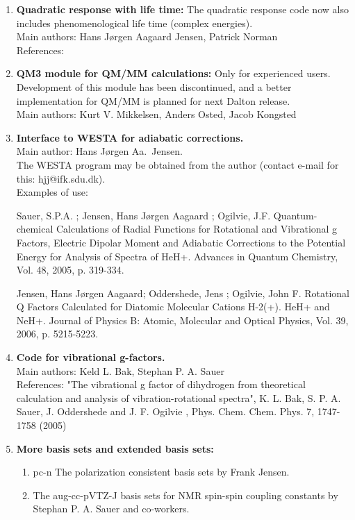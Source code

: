 \begin{enumerate}
\item{\bf Quadratic response with life time:} The quadratic response code now also
includes phenomenological life time (complex energies).  \\
Main authors: Hans J\o rgen Aagaard Jensen, Patrick Norman \\
References: \cite{pndmbhjajjojcp123}

\item{\bf QM3 module for QM/MM calculations:} Only for experienced users. Development of this module has been discontinued,
and a better implementation for QM/MM is planned for next Dalton release.  \\
Main authors: Kurt V. Mikkelsen, Anders Osted, Jacob Kongsted

\item{\bf Interface to WESTA for adiabatic corrections.}  \\
Main author: Hans J\o rgen Aa.\ Jensen.\\
 The WESTA program may be obtained from the author
 (contact e-mail for this: hjj@ifk.sdu.dk).\\
 Examples of use:

Sauer, S.P.A. ; Jensen, Hans Jørgen Aagaard ; Ogilvie, J.F. 
Quantum-chemical Calculations of Radial Functions for Rotational and
Vibrational g Factors, Electric Dipolar Moment and Adiabatic Corrections
to the Potential Energy for Analysis of Spectra of HeH+. 
Advances in Quantum Chemistry, Vol. 48, 2005, p. 319-334. 

 Jensen, Hans Jørgen Aagaard; Oddershede, Jens ; Ogilvie, John F.
Rotational Q Factors Calculated for Diatomic Molecular Cations H-2(+).
HeH+ and NeH+. 
Journal of Physics B: Atomic, Molecular and Optical Physics, Vol.
39, 2006, p. 5215-5223. 


\item{\bf Code for vibrational g-factors.}  \\
Main authors: Keld L. Bak, Stephan P. A. Sauer\\
   References: "The vibrational g factor of dihydrogen from theoretical calculation
   and analysis of vibration-rotational spectra", K. L. Bak, S. P. A. Sauer, J. Oddershede and J. F. Ogilvie ,
   Phys. Chem. Chem. Phys. 7, 1747-1758 (2005)

\item{\bf More basis sets and extended basis sets:}
\begin{enumerate}
  \item{pc-n} The polarization consistent basis sets by Frank Jensen.
  \item{The aug-cc-pVTZ-J} basis sets for NMR spin-spin coupling constants by Stephan P. A. Sauer and co-workers.
\end{enumerate}


\end{enumerate}
